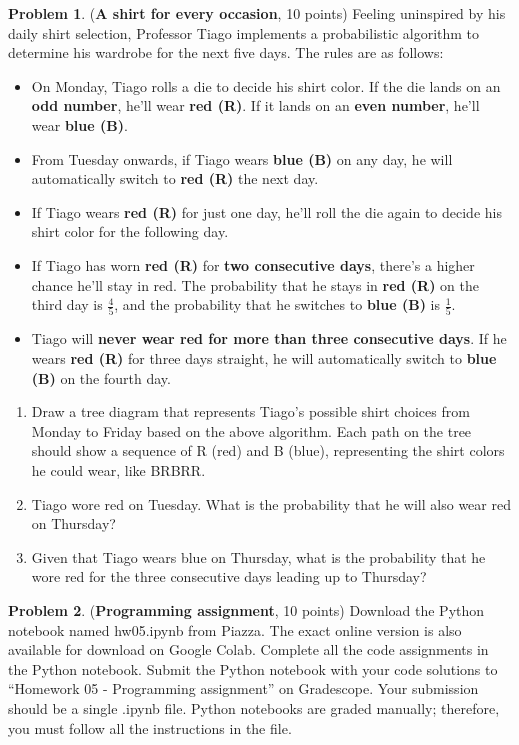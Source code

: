 \documentclass[letterpaper,11pt]{article}
\theoremstyle{plain}%
\theoremstyle{definition}
\newtheorem{problem}{Problem}
\theoremstyle{plain}%
\begin{document}
\begin{problem} (\textbf{A shirt for every occasion}, 10 points)
Feeling uninspired by his daily shirt selection, Professor Tiago implements a probabilistic algorithm to determine his wardrobe for the next five days. The rules are as follows:


\begin{itemize}
    \item On Monday, Tiago rolls a die to decide his shirt color. If the die lands on an \textbf{odd number}, he’ll wear \textbf{red (R)}. If it lands on an \textbf{even number}, he’ll wear \textbf{blue (B)}.
    
    \item From Tuesday onwards, if Tiago wears \textbf{blue (B)} on any day, he will automatically switch to \textbf{red (R)} the next day.
        
    \item If Tiago wears \textbf{red (R)} for just one day, he’ll roll the die again to decide his shirt color for the following day.
        
    \item If Tiago has worn \textbf{red (R)} for \textbf{two consecutive days}, there’s a higher chance he’ll stay in red. The probability that he stays in \textbf{red (R)} on the third day is \(\frac{4}{5}\), and the probability that he switches to \textbf{blue (B)} is \(\frac{1}{5}\).
        
    \item Tiago will \textbf{never wear red for more than three consecutive days}. If he wears \textbf{red (R)} for three days straight, he will automatically switch to \textbf{blue (B)} on the fourth day.
    \end{itemize}

\begin{enumerate}[label=(\alph*)]
    \item Draw a tree diagram that represents Tiago’s possible shirt choices from Monday to Friday based on the above algorithm. Each path on the tree should show a sequence of R (red) and B (blue), representing the shirt colors he could wear, like BRBRR.
    \item Tiago wore red on Tuesday. What is the probability that he will also wear red on Thursday? 
    \item Given that Tiago wears blue on Thursday, what is the probability that he wore red for the three consecutive days leading up to Thursday?
\end{enumerate}
\end{problem}

\begin{problem}({\bf Programming assignment}, 10 points) Download the Python notebook named hw05.ipynb from Piazza. The exact online version is also available for download on Google Colab. Complete all the code assignments in the Python notebook. Submit the Python notebook with your code solutions to ``Homework 05 - Programming assignment'' on Gradescope. Your submission should be a single .ipynb file. Python notebooks are graded manually; therefore, you must follow all the instructions in the file.
\end{problem}
\end{document}
